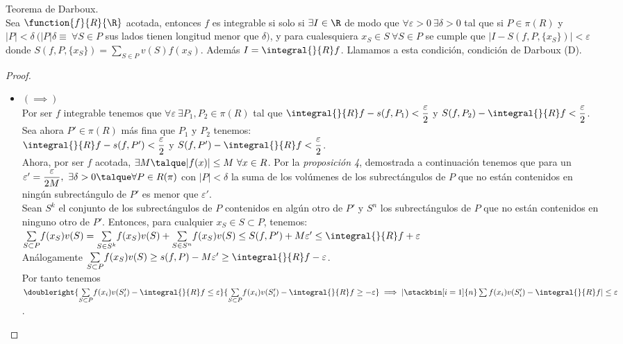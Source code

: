 	\begin{teor} Teorema de Darboux.\\
	Sea $\function{f}{R}{\R}$ acotada, entonces $f$ es integrable si solo si $\exists I\in\R$ de modo que $\forall\varepsilon>0\ \exists\delta>0$ tal que si $P\in\pi(R)$ y $|P|<\delta\ (|P|\delta\equiv\ \forall S\in P$ sus lados tienen longitud menor que $\delta)$, y para cualesquiera $x_S\in S\ \forall S\in P$ se cumple que $|I-S(f,P,\{x_S\})|<\varepsilon$ donde $S(f,P,\{x_S\})=\underset{S\in P}\sum v(S)f(x_S)$. Además $I=\integral{}{R}f$. Llamamos a esta condición, condición de Darboux (D).
	\begin{proof}\ 
	\begin{itemize} 
		\item $(\implies)$\\
		Por ser $f$ integrable tenemos que $\forall\varepsilon\ \exists P_1,P_2 \in \pi(R)$ tal que $\integral{}{R}f-s(f,P_1)<\dfrac{\varepsilon}{2}$ y $S(f,P_2)-\integral{}{R}f<\dfrac{\varepsilon}{2}$. Sea ahora $P'\in\pi(R)$ más fina que $P_1$ y $P_2$ tenemos:\\
			$\integral{}{R}f-s(f,P')<\dfrac{\varepsilon}{2}$ y $S(f,P')-\integral{}{R}f<\dfrac{\varepsilon}{2}$.\\
	Ahora, por ser $f$ acotada, $\exists M\talque |f(x)|\leq M\ \forall x\in R$. Por la \textit{proposición 4}, demostrada a continuación tenemos que para un $\varepsilon'=\dfrac{\varepsilon}{2M},\ \exists \delta >0 \talque \forall P\in R(\pi)$ con $|P|<\delta$ la suma de los volúmenes de los subrectángulos de $P$ que no están contenidos en ningún subrectángulo de $P'$ es menor que $\varepsilon'$.\\
		Sean $S^k$ el conjunto de los subrectángulos de $P$ contenidos en algún otro de $P'$ y $S^n$ los subrectángulos de $P$ que no están contenidos en ninguno otro de $P'$. Entonces, para cualquier $x_S\in S\subset P$, tenemos:\\
		$\underset{S\subset P}\sum f(x_S)v(S) = \underset{S\in S^k}\sum f(x_S)v(S) + \underset{S\in S^n}\sum f(x_S)v(S)\leq S(f,P')+M\varepsilon'\leq \integral{}{R}f+\varepsilon$\\
		Análogamente $\underset{S\subset P}\sum f(x_S)v(S)\geq s(f,P)-M\varepsilon' \geq \integral{}{R}f-\varepsilon$.\\
		Por tanto tenemos $\doubleright{\underset{S\subset P}\sum f(x_i)v(S_i')-\integral{}{R}f\leq \varepsilon}{\underset{S\subset P}\sum f(x_i)v(S_i')-\integral{}{R}f\geq -\varepsilon}\implies \left|\stackbin[i=1]{n}\sum f(x_i)v(S_i')-\integral{}{R}f\right|\leq \varepsilon$.\\

\end{itemize}
\end{proof}
\end{teor}
